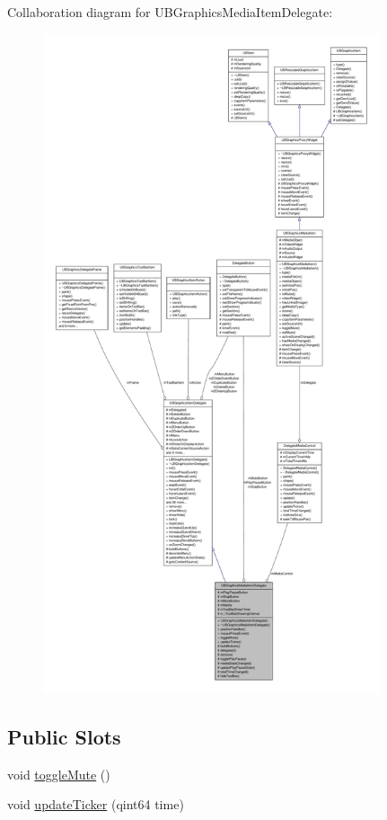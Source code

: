 Collaboration diagram for U\-B\-Graphics\-Media\-Item\-Delegate\-:
\nopagebreak
\begin{figure}[H]
\begin{center}
\leavevmode
\includegraphics[height=550pt]{d6/d08/class_u_b_graphics_media_item_delegate__coll__graph}
\end{center}
\end{figure}
\subsection*{Public Slots}
\begin{DoxyCompactItemize}
\item 
void \hyperlink{class_u_b_graphics_media_item_delegate_a312ea9c1bd8166a5e19aecbccaf90cf9}{toggle\-Mute} ()
\item 
void \hyperlink{class_u_b_graphics_media_item_delegate_a302ad976f1306f959d838371cd441dc9}{update\-Ticker} (qint64 time)
\end{DoxyCompactItemize}
